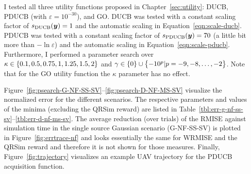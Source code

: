 I tested all three utility functions proposed in Chapter~\ref{sec:utility}: 
DUCB, PDUCB (with $\varepsilon = 10^{-30}$), and GO\@. DUCB was tested with 
a constant scaling factor of $s_{\mathrm{DUCB}}(\bm{y}) = 1$ and the automatic scaling 
in Equation~\ref{eqn:scale-ducb}.  PDUCB was tested with a constant scaling 
factor of $s_{\mathrm{PDUCB}}(\bm{y}) = 70$ (a little bit more than $-\ln \varepsilon$) 
and the automatic scaling in Equation~\ref{eqn:scale-pducb}.  Furthermore, 
I performed a parameter search over $\kappa \in \cbr{0.1, 0.5, 
0.75, 1, 1.25, 1.5, 2}$ and $\gamma \in \cbr{0} \cup \cbr{-10^p | p = -9, -8, 
  \dots, -2}$. Note that for the GO utility function the $\kappa$ parameter has 
no effect.

Figure~\ref{fig:psearch-G-NF-SS-SV}--\ref{fig:psearch-D-NF-MS-SV} visualize the 
normalized error for the different scenarios.  The respective parameters and 
values of the minima (excluding the QRSim reward) are listed in 
Table~\ref{tbl:err-g-nf-ss-sv}--\ref{tbl:err-d-nf-ms-sv}.  The average reduction 
(over trials) of the RMISE against simulation time in the single source Gaussian 
scenario (G-NF-SS-SV) is plotted in Figure~\ref{fig:errtrace-nf} and looks 
essentially the same for WRMISE and the QRSim reward and therefore it is not 
shown for those measures. Finally, Figure~\ref{fig:trajectory} visualizes an 
example UAV trajectory for the PDUCB acquisition function.

